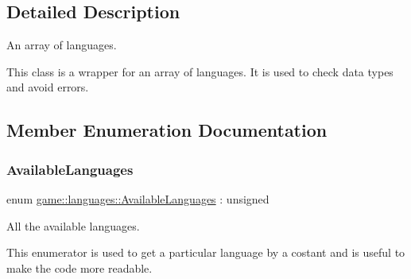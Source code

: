 \subsection{Detailed Description}
An array of languages. 

This class is a wrapper for an array of languages. It is used to check data types and avoid errors. 

\subsection{Member Enumeration Documentation}
\mbox{\label{classgame_1_1languages_ad965ce3a9fdce02ab3caba6301f221eb}} 
\subsubsection{\texorpdfstring{AvailableLanguages}{AvailableLanguages}}
{\footnotesize\ttfamily enum \mbox{\hyperlink{classgame_1_1languages_ad965ce3a9fdce02ab3caba6301f221eb}{game\+::languages\+::\+Available\+Languages}} \+: unsigned}



All the available languages. 

This enumerator is used to get a particular language by a costant and is useful to make the code more readable.

